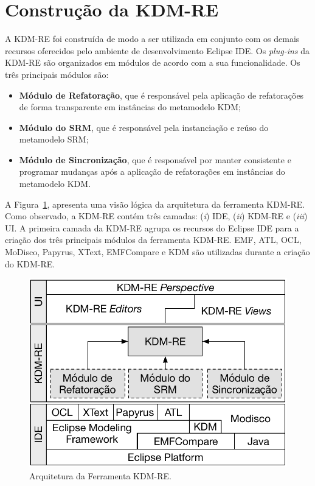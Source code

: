 \section{Construção da KDM-RE}\label{sec:construcao_da_kdm_re}

A KDM-RE foi construída de modo a ser utilizada em conjunto com os demais recursos oferecidos pelo ambiente de desenvolvimento Eclipse IDE. Os \textit{plug-ins} da KDM-RE são organizados em módulos de acordo com a sua funcionalidade. Os três principais módulos são:

\begin{itemize}
\item \textbf{Módulo de Refatoração}, que é responsável pela aplicação de refatorações de forma transparente em instâncias do metamodelo KDM;

\item \textbf{Módulo do SRM}, que é responsável pela instanciação e reúso do metamodelo SRM;

\item \textbf{Módulo de Sincronização}, que é responsável por manter consistente e programar mudanças após a aplicação de refatorações em instâncias do metamodelo KDM.

\end{itemize}

A Figura~\ref{fig:arquitetura_ferramenta_kdm_re}, apresenta uma visão lógica da arquitetura da ferramenta KDM-RE. Como observado, a KDM-RE contém três camadas: (\textit{i}) IDE, (\textit{ii}) KDM-RE e (\textit{iii}) UI. A primeira camada da KDM-RE agrupa os recursos do Eclipse IDE para a criação dos três principais módulos da ferramenta KDM-RE. EMF, ATL, OCL, MoDisco, Papyrus, XText, EMFCompare e KDM são utilizadas durante a criação do KDM-RE.

\begin{figure}[h]
	\centering
	\caption{Arquitetura da Ferramenta KDM-RE.}
	\label{fig:arquitetura_ferramenta_kdm_re}
	\includegraphics[scale=0.75]{images/arquitetura_KDM-RE}
	\fautor
\end{figure}

